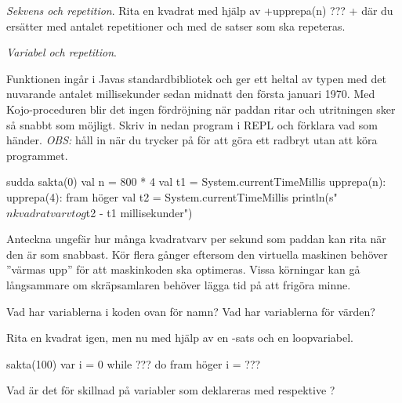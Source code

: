\Task \textit{Sekvens och repetition}. Rita en kvadrat med hjälp av \code+upprepa(n){ ??? }+ där du ersätter  med antalet repetitioner och  med de satser som ska repeteras.






\Task \textit{Variabel och repetition}.

\Subtask Funktionen  ingår i Javas standardbibliotek och ger ett heltal av typen  med det nuvarande antalet millisekunder sedan midnatt den första januari 1970.  Med Kojo-proceduren  blir det ingen fördröjning när paddan ritar och utritningen sker så snabbt som möjligt. Skriv in nedan program i REPL och förklara vad som händer. \emph{OBS:} håll in  när du trycker på  för att göra ett radbryt utan att köra programmet.
\begin{Code}
sudda
sakta(0)
val n = 800 * 4
val t1 = System.currentTimeMillis
upprepa(n):
  upprepa(4):
    fram
    höger
val t2 = System.currentTimeMillis
println(s"$n kvadratvarv tog ${t2 - t1} millisekunder")
\end{Code}

\Subtask\Pen Anteckna ungefär hur många kvadratvarv per sekund som paddan kan rita när den är som snabbast. Kör flera gånger eftersom den virtuella maskinen behöver ''värmas upp'' för att maskinkoden ska optimeras. Vissa körningar kan gå långsammare om skräpsamlaren behöver lägga tid på att frigöra minne.

\Subtask\Pen Vad har variablerna i koden ovan för namn? Vad har variablerna för värden?

\Subtask Rita en kvadrat igen, men nu med hjälp av en -sats och en loopvariabel. %

\begin{Code}
sakta(100)
var i = 0
while ??? do
  fram
  höger
  i = ???
\end{Code}

\Subtask\Pen Vad är det för skillnad på variabler som deklareras med  respektive ?


